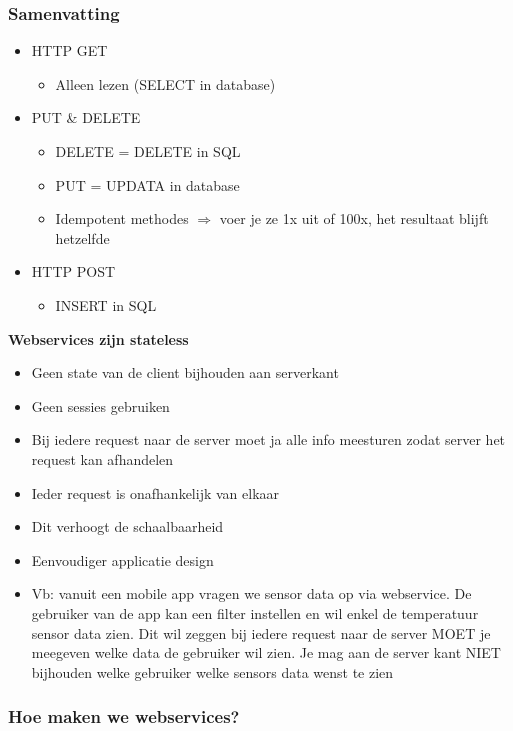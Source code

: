 \documentclass{article}
\newcommand{\bold}[1]{\textbf{#1}}
\begin{document}
\subsubsection{Samenvatting}
\begin{itemize}
    \item HTTP GET
    \begin{itemize}
        \item Alleen lezen (SELECT in database)
    \end{itemize}
    \item PUT \& DELETE
    \begin{itemize}
        \item DELETE = DELETE in SQL
        \item PUT = UPDATA in database
        \item Idempotent methodes $\Rightarrow$ voer je ze 1x uit of 100x, het resultaat blijft hetzelfde
    \end{itemize}
    \item HTTP POST
    \begin{itemize}
        \item INSERT in SQL
    \end{itemize}
\end{itemize}

\bold{Webservices zijn stateless}

\begin{itemize}
    \item Geen state van de client bijhouden aan serverkant
    \item Geen sessies gebruiken
    \item Bij iedere request naar de server moet ja alle info meesturen zodat server het request kan afhandelen
    \item Ieder request is onafhankelijk van elkaar
    \item Dit verhoogt de schaalbaarheid
    \item Eenvoudiger applicatie design
    \item Vb: vanuit een mobile app vragen we sensor data op via webservice. 
    De gebruiker van de app kan een filter instellen en wil enkel de temperatuur sensor data zien. 
    Dit wil zeggen bij iedere request naar de server MOET je meegeven welke data de gebruiker wil zien. 
    Je mag aan de server kant NIET bijhouden welke gebruiker welke sensors data wenst te zien
\end{itemize}

\subsubsection{Hoe maken we webservices?}
\end{document}
